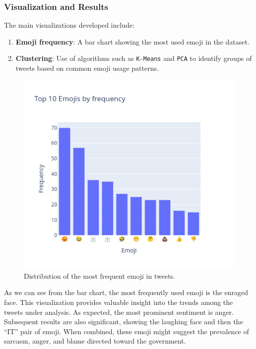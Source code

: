 \subsubsection{Visualization and Results}
The main visualizations developed include:
\begin{enumerate}
    \item \textbf{Emoji frequency}: A bar chart showing the most used emoji in the dataset.
    \item \textbf{Clustering}: Use of algorithms such as \texttt{K-Means} and \texttt{PCA} to identify groups of tweets based on common emoji usage patterns.
\end{enumerate}
\begin{figure}
    \includegraphics[width=\columnwidth]{../../results/images/emoji_top10.png}
    \caption{Distribution of the most frequent emoji in tweets.}
    \label{fig:emoji_frequenze}
\end{figure}
As we can see from the bar chart, the most frequently used emoji is the enraged face. This visualization provides valuable insight into the trends among the tweets under analysis. As expected, the most prominent sentiment is anger. Subsequent results are also significant, showing the laughing face and then the “IT” pair of emoji. When combined, these emoji might suggest the prevalence of sarcasm, anger, and blame directed toward the government.

